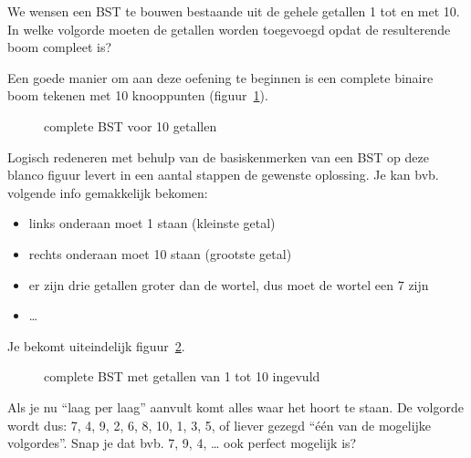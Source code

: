 \begin{oef}
\papier We wensen een BST te bouwen bestaande uit de gehele getallen 1 tot en met 10. In welke volgorde moeten de getallen worden toegevoegd opdat de resulterende boom compleet is?
\begin{opl}
Een goede manier om aan deze oefening te beginnen is een complete binaire boom tekenen met 10 knooppunten (figuur~\ref{fig:herhoefBST2Stap1}).
\begin{figure}[htbp]
    \centering
{}
\caption{complete BST voor 10 getallen}
    \label{fig:herhoefBST2Stap1}
\end{figure}
Logisch redeneren met behulp van de basiskenmerken van een BST op deze blanco figuur levert in een aantal stappen de gewenste oplossing. Je kan bvb. volgende info gemakkelijk bekomen:
\begin{itemize}
\item links onderaan moet 1 staan (kleinste getal)
\item rechts onderaan moet 10 staan (grootste getal)
\item er zijn drie getallen groter dan de wortel, dus moet de wortel een 7 zijn
\item …
\end{itemize}
Je bekomt uiteindelijk figuur~\ref{fig:herhoefBST2Stap2}.
\begin{figure}[htbp]
    \centering
{}
\caption{complete BST met getallen van 1 tot 10 ingevuld}
    \label{fig:herhoefBST2Stap2}
\end{figure}
Als je nu “laag per laag” aanvult komt alles waar het hoort te staan. De volgorde wordt dus: 7, 4, 9, 2, 6, 8, 10, 1, 3, 5, of liever gezegd “één van de mogelijke volgordes”. Snap je dat bvb. 7, 9, 4, … ook perfect mogelijk is?

\end{opl}

\end{oef}



